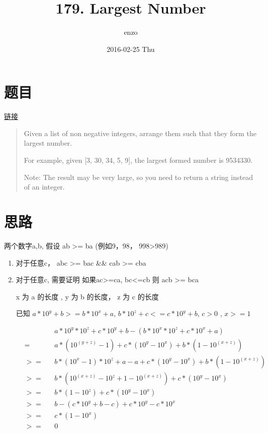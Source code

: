 \documentclass[11pt,a4paper]{article}
\author{enzo}
\date{2016-02-25 Thu}
\title{179. Largest Number}
\begin{document}
\maketitle

\section*{题目}
\label{sec:orge26a73b}

\href{https://leetcode.com/problems/largest-number/}{链接}

\begin{quote}
Given a list of non negative integers, arrange them such that they form the largest number.

For example, given [3, 30, 34, 5, 9], the largest formed number is 9534330.

Note: The result may be very large, so you need to return a string instead of an integer.
\end{quote}

\section*{思路}
\label{sec:org9e732b7}

两个数字a,b, 假设 ab >= ba (例如9，98， 998>989)

\begin{enumerate}
\item 对于任意c， abc >= bac \&\& cab >= cba
\item 对于任意c,  需要证明 如果ac>=ca, bc<=cb 则 acb >= bca

x 为 a 的长度 , y 为 b 的长度， z 为 c 的长度

已知 \(a*10^y + b >= b*10^x + a\), \(b*10^z + c <= c * 10^y+b\), \(c > 0\) , \(x >= 1\)

\begin{equation}
\begin{split}
&    & & a*10^y*10^z + c * 10^y + b - (b*10^x*10^z + c*10^x + a) \\
& =  & & a*(10^{(y+z)} -1) + c * (10^y - 10^x) + b*(1-10^{(x+z)}) \\
& >= & & b*(10^x-1)*10^z + a - a + c * (10^y - 10^x) + b*(1-10^(x+z)) \\
& >= & & b*(10^{(x+z)}-10^z+1-10^{(x+z)}) + c * (10^y-10^x) \\
& >= & & b*(1-10^z) + c * (10^y-10^x) \\
& >= & & b - (c*10^y+b-c) + c *10^y - c * 10^x \\
& >= & & c*(1-10^x) \\
& >= & & 0
\end{split}
\end{equation}
\end{enumerate}
\end{document}
